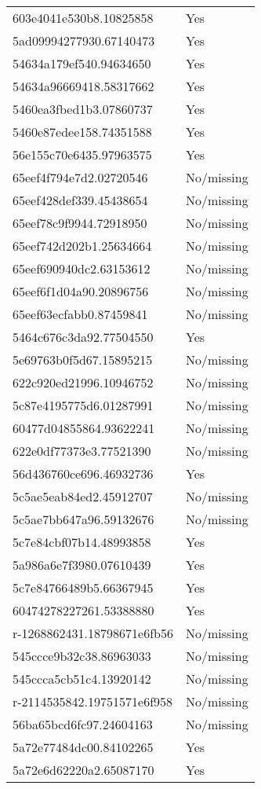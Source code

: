 \begin{tabular}{ll}
603e4041e530b8.10825858 & Yes \\
5ad09994277930.67140473 & Yes \\
54634a179ef540.94634650 & Yes \\
54634a96669418.58317662 & Yes \\
5460ea3fbed1b3.07860737 & Yes \\
5460e87edee158.74351588 & Yes \\
56e155c70e6435.97963575 & Yes \\
65eef4f794e7d2.02720546 & No/missing \\
65eef428def339.45438654 & No/missing \\
65eef78c9f9944.72918950 & No/missing \\
65eef742d202b1.25634664 & No/missing \\
65eef690940dc2.63153612 & No/missing \\
65eef6f1d04a90.20896756 & No/missing \\
65eef63ecfabb0.87459841 & No/missing \\
5464c676c3da92.77504550 & Yes \\
5e69763b0f5d67.15895215 & No/missing \\
622c920ed21996.10946752 & No/missing \\
5c87e4195775d6.01287991 & No/missing \\
60477d04855864.93622241 & No/missing \\
622e0df77373e3.77521390 & No/missing \\
56d436760ce696.46932736 & Yes \\
5c5ae5eab84ed2.45912707 & No/missing \\
5c5ae7bb647a96.59132676 & No/missing \\
5c7e84cbf07b14.48993858 & Yes \\
5a986a6e7f3980.07610439 & Yes \\
5c7e84766489b5.66367945 & Yes \\
60474278227261.53388880 & Yes \\
r-1268862431.18798671e6fb56 & No/missing \\
545ccce9b32c38.86963033 & No/missing \\
545ccca5cb51c4.13920142 & No/missing \\
r-2114535842.19751571e6f958 & No/missing \\
56ba65bcd6fc97.24604163 & No/missing \\
5a72e77484dc00.84102265 & Yes \\
5a72e6d62220a2.65087170 & Yes \\

\end{tabular}
